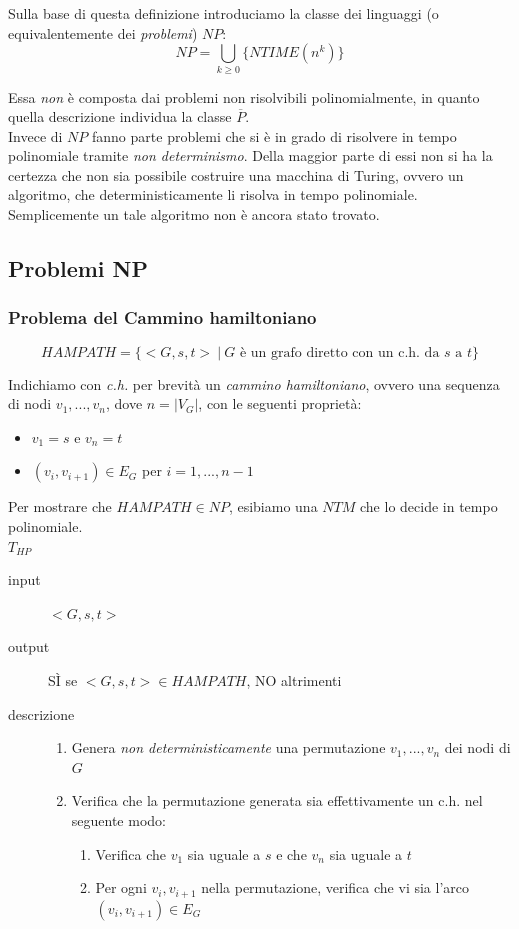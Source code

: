 Sulla base di questa definizione introduciamo la classe dei linguaggi (o equivalentemente dei \emph{problemi}) $NP$:
\[
	NP = \bigcup_{k \geq 0} \{ NTIME(n^k) \}
\]

Essa \emph{non} è composta dai problemi non risolvibili polinomialmente, in quanto quella descrizione individua la classe $\overline{P}$. 
\\
Invece di $NP$ fanno parte problemi che si è in grado di risolvere in tempo polinomiale tramite \emph{non determinismo}. Della maggior parte di essi non si ha la certezza che non sia possibile costruire una macchina di Turing, ovvero un algoritmo, che deterministicamente li risolva in tempo polinomiale. Semplicemente un tale algoritmo non è ancora stato trovato.

\subsection{Problemi NP}

\subsubsection{Problema del Cammino hamiltoniano}

\[
	HAMPATH = \{ <G, s, t> \ | \ G \text{ è un grafo diretto con un c.h. da } s \text{ a } t\}
\]

Indichiamo con \emph{c.h.} per brevità un \emph{cammino hamiltoniano}, ovvero una sequenza di nodi $v_1,...,v_n$, dove $n = |V_G|$, con le seguenti proprietà:
\begin{itemize}
	\item $v_1 = s$ e $v_n = t$
	\item $(v_i, v_{i+1}) \in E_G$ per $i = 1, ..., n-1$
\end{itemize}

Per mostrare che $HAMPATH \in NP$, esibiamo una $NTM$ che lo decide in tempo polinomiale.
\\

$T_{HP}$
\begin{description}
	\item[input] $<G, s, t>$

	\item[output] SÌ se $<G,s,t> \in HAMPATH$, NO altrimenti

	\item[descrizione]
	\begin{enumerate}[label*=\arabic*.]
		\item Genera \emph{non deterministicamente} una permutazione $v_1, ..., v_n$ dei nodi di $G$

		\item Verifica che la permutazione generata sia effettivamente un c.h. nel seguente modo:
		\begin{enumerate}[label*=\arabic*.]
			\item Verifica che $v_1$ sia uguale a $s$ e che $v_n$ sia uguale a $t$
			\item Per ogni $v_i, v_{i+1}$ nella permutazione, verifica che vi sia l'arco $(v_i, v_{i+1}) \in E_G$
		\end{enumerate}
	\end{enumerate}
\end{description}

